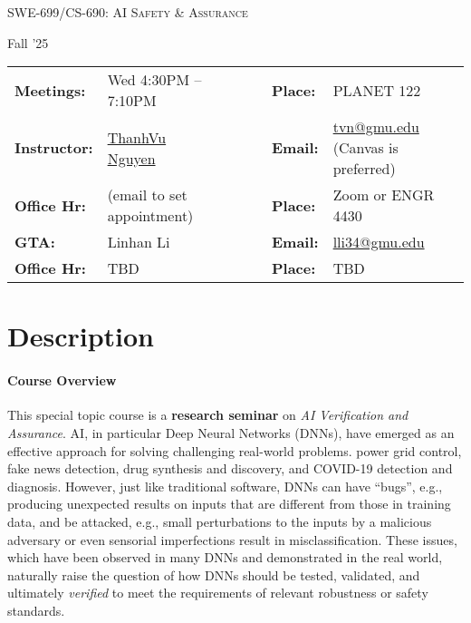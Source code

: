 \documentclass[11pt]{article}
\begin{document}
\begin{center}
{\Large \textsc{SWE-699/CS-690: AI Safety \& Assurance}}

\vspace{0.1in}
{\large Fall '25}
\end{center}

\begin{minipage}[t]{.75\textwidth}
    \centering
\begin{tabular}{llcccll}
  \toprule
  \textbf{Meetings:} & Wed 4:30PM -- 7:10PM  & & & & \textbf{Place:} & PLANET 122\\
\textbf{Instructor:} & \href{https://roars.dev}{ThanhVu Nguyen} & & &  & \textbf{Email:} &  \href{mailto:tvn@gmu.edu}{tvn@gmu.edu} (Canvas is preferred)\\
\textbf{Office Hr:} & (email to set appointment)& & & & \textbf{Place:} & Zoom or ENGR 4430\\
  \hline
\textbf{GTA:} & Linhan Li & & &  & \textbf{Email:} &  \href{mailto:lli34@gmu.edu}{lli34@gmu.edu}\\
\textbf{Office Hr:} & TBD & & & & \textbf{Place:} & TBD \\
\bottomrule
\end{tabular}
\end{minipage}
 

\section{Description}

\paragraph{Course Overview}
This special topic course is a \textbf{research seminar} on \emph{AI Verification and Assurance}.  AI, in particular Deep Neural Networks (DNNs), have emerged as an effective approach for solving challenging real-world problems. %
power grid control, fake news detection, drug synthesis and discovery, 
and COVID-19 detection and diagnosis.
However, just like traditional software, DNNs can have ``bugs'', e.g., producing unexpected results on inputs that are different from those in training data, and be attacked, e.g., small perturbations to the inputs by a malicious adversary or even sensorial imperfections result in misclassification.
These issues, which have been observed in many DNNs and demonstrated in the real world,  naturally raise the question of how DNNs should be tested, validated, and ultimately \emph{verified} to meet the requirements of relevant robustness or safety standards.
\end{document}
